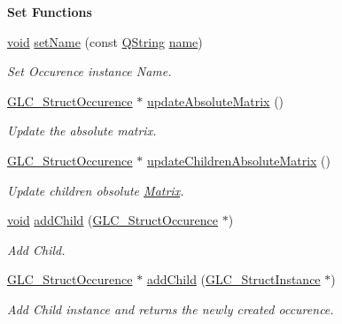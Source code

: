 \begin{Indent}{\bf Set Functions}\par
\begin{DoxyCompactItemize}
\item 
\hyperlink{group___u_a_v_objects_plugin_ga444cf2ff3f0ecbe028adce838d373f5c}{void} \hyperlink{class_g_l_c___struct_occurence_a6a87761ca87bc498b099d0c7f2602d0c}{set\-Name} (const \hyperlink{group___u_a_v_objects_plugin_gab9d252f49c333c94a72f97ce3105a32d}{Q\-String} \hyperlink{glext_8h_ad977737dfc9a274a62741b9500c49a32}{name})
\begin{DoxyCompactList}\small\item\em Set Occurence instance Name. \end{DoxyCompactList}\item 
\hyperlink{class_g_l_c___struct_occurence}{G\-L\-C\-\_\-\-Struct\-Occurence} $\ast$ \hyperlink{class_g_l_c___struct_occurence_a2403c8b6f018ab76caf2629ea89d4ecc}{update\-Absolute\-Matrix} ()
\begin{DoxyCompactList}\small\item\em Update the absolute matrix. \end{DoxyCompactList}\item 
\hyperlink{class_g_l_c___struct_occurence}{G\-L\-C\-\_\-\-Struct\-Occurence} $\ast$ \hyperlink{class_g_l_c___struct_occurence_ab29afb66038b64259ecfc360ee1f8b6a}{update\-Children\-Absolute\-Matrix} ()
\begin{DoxyCompactList}\small\item\em Update children obsolute \hyperlink{class_matrix}{Matrix}. \end{DoxyCompactList}\item 
\hyperlink{group___u_a_v_objects_plugin_ga444cf2ff3f0ecbe028adce838d373f5c}{void} \hyperlink{class_g_l_c___struct_occurence_af2023d4e6924cbe12d1ccfde8804ffbe}{add\-Child} (\hyperlink{class_g_l_c___struct_occurence}{G\-L\-C\-\_\-\-Struct\-Occurence} $\ast$)
\begin{DoxyCompactList}\small\item\em Add Child. \end{DoxyCompactList}\item 
\hyperlink{class_g_l_c___struct_occurence}{G\-L\-C\-\_\-\-Struct\-Occurence} $\ast$ \hyperlink{class_g_l_c___struct_occurence_afc428487fa7c8b3b8348bc546e0d3fd4}{add\-Child} (\hyperlink{class_g_l_c___struct_instance}{G\-L\-C\-\_\-\-Struct\-Instance} $\ast$)
\begin{DoxyCompactList}\small\item\em Add Child instance and returns the newly created occurence. \end{DoxyCompactList}\item 

\end{DoxyCompactItemize}
\end{Indent}

